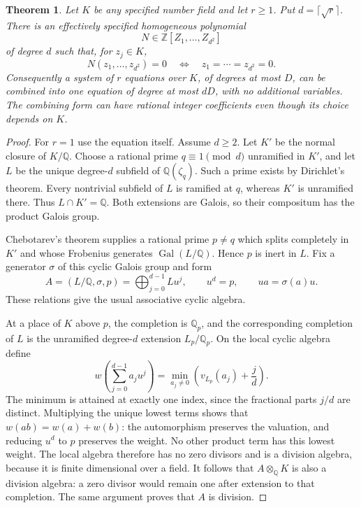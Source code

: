 \documentclass[11pt]{article}
\newtheorem{theorem}{Theorem}[section]
\theoremstyle{definition}
\begin{document}
\begin{theorem}\label{thm:division-norm-conjunction-phase3}
Let $K$ be any specified number field and let $r\ge1$.
Put $d=\lceil\sqrt r\rceil$.  There is an effectively specified
homogeneous polynomial
\[
                 N\in\mathbb Z[Z_1,\ldots,Z_{d^2}]
\]
of degree $d$ such that, for $z_j\in K$,
\[
                  N(z_1,\ldots,z_{d^2})=0
                  \quad\Longleftrightarrow\quad z_1=\cdots=z_{d^2}=0.
\]
Consequently a system of $r$ equations over $K$, of degrees at
most $D$, can be combined into one equation of degree at most
$dD$, with no additional variables.  The combining form can have
rational integer coefficients even though its choice depends on $K$.
\end{theorem}
\begin{proof}
For $r=1$ use the equation itself.  Assume $d\ge2$.  Let $K'$ be
the normal closure of $K/\mathbb Q$.  Choose a rational prime
$q\equiv1\pmod d$ unramified in $K'$, and let $L$ be the unique
degree-$d$ subfield of $\mathbb Q(\zeta_q)$.  Such a prime exists
by Dirichlet's theorem.  Every nontrivial subfield of $L$ is
ramified at $q$, whereas $K'$ is unramified there.  Thus
$L\cap K'=\mathbb Q$.  Both extensions are Galois, so their
compositum has the product Galois group.

Chebotarev's theorem supplies a rational prime $p\ne q$ which
splits completely in $K'$ and whose Frobenius generates
$\operatorname{Gal}(L/\mathbb Q)$.  Hence $p$ is inert in $L$.
Fix a generator $\sigma$ of this cyclic Galois group and form
\[
 A=(L/\mathbb Q,\sigma,p)
   =\bigoplus_{j=0}^{d-1}L u^j,
 \qquad u^d=p,\qquad ua=\sigma(a)u.
\]
These relations give the usual associative cyclic algebra.

At a place of $K$ above $p$, the completion is $\mathbb Q_p$,
and the corresponding completion of $L$ is the unramified
degree-$d$ extension $L_p/\mathbb Q_p$.  On the local cyclic
algebra define
\[
 w\left(\sum_{j=0}^{d-1}a_j u^j\right)
       =\min_{a_j\ne0}\left(v_{L_p}(a_j)+\frac jd\right).
\]
The minimum is attained at exactly one index, since the
fractional parts $j/d$ are distinct.  Multiplying the unique
lowest terms shows that $w(ab)=w(a)+w(b)$: the automorphism
preserves the valuation, and reducing $u^d$ to $p$ preserves
the weight.  No other product term has this lowest weight.
The local algebra therefore has no zero divisors and is a
division algebra, because it is finite dimensional over a field.
It follows that $A\otimes_{\mathbb Q}K$ is also a division
algebra: a zero divisor would remain one after extension to
that completion.  The same argument proves that $A$ is division.


\end{proof}
\end{document}
